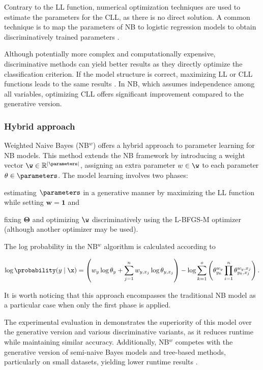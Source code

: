 Contrary to the LL function, numerical optimization techniques are used to estimate the parameters for the CLL, as there is no direct solution. A common technique is to map the parameters of NB to logistic regression models to obtain discriminatively trained parameters \cite{Roos2005,Zaidi2013,Zaidi2017}.

Although potentially more complex and computationally expensive, discriminative methods can yield better results as they directly optimize the classification criterion. If the model structure is correct, maximizing LL or CLL functions leads to the same results \cite{Rubinstein1997}. In NB, which assumes independence among all variables, optimizing CLL offers significant improvement compared to the generative version.

\subsubsection{Hybrid approach} Weighted Naive Bayes (NB$^w$) \cite{Zaidi2013,Zaidi2017} offers a hybrid approach to parameter learning for NB models. This method extends the NB framework by introducing a weight vector $\w \in \mathbb{R}^{|\parameters|}$, assigning an extra parameter \(w \in \w\) to each parameter \(\theta \in \parameters\). The model learning involves two phases:
%
\begin{enumerate*}[label=(\alph*)]
    \item estimating $\parameters$ in a generative manner by maximizing the LL function while setting $\mathbf{w} = \mathbf{1}$ and
    \item fixing $\mathbf{\Theta}$ and optimizing $\w$ discriminatively using the L-BFGS-M optimizer \cite{Zhu1997} (although another optimizer may be used).
\end{enumerate*}

The log probability in the NB$^w$ algorithm is calculated according to

\begin{equation*}
    \log \probability(y \mid \x) =  \left(w_y \log\theta_y + \sum_{j = 1}^{n} w_{y, x_j} \log \theta_{y, x_j}\right) - \log \sum_{k = 1}^{o} \left(\theta_{y_k}^{w_y} \prod_{i = 1}^n \theta_{y_k, x_j}^{w_y, x_j}\right).
\end{equation*}

It is worth noticing that this approach encompasses the traditional NB model as a particular case when only the first phase is applied.

The experimental evaluation in \cite{Zaidi2017} demonstrates the superiority of this model over the generative version and various discriminative variants, as it reduces runtime while maintaining similar accuracy. Additionally, NB$^w$ competes with the generative version of semi-naive Bayes models and tree-based methods, particularly on small datasets, yielding lower runtime results \cite{Zaidi2013}.


